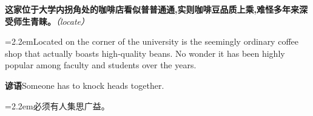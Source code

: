 \documentclass[11pt,a4paper]{article}
\newcommand{\num}[1]{\makebox[1.9em][r]{#1.}\hspace{0.3em}}
\newcommand{\prompt}[1]{\emph{\textcolor{tipblue}{\small（#1）}}}
\begin{document}
\num{4}\textbf{这家位于大学内拐角处的咖啡店看似普普通通,实则咖啡豆品质上乘,难怪多年来深受师生青睐。}\prompt{locate}

\vspace{0.15em}

\noindent\hangindent=2.2em\hspace{2.2em}Located on the corner of the university is the seemingly ordinary coffee shop that actually boasts high-quality beans. No wonder it has been highly popular among faculty and students over the years.

\vspace{0.4em}\noindent{\color{rulegray}\rule{\textwidth}{0.6pt}}\vspace{0.4em}

\num{5}\textbf{谚语}\quad Someone has to knock heads together.

\vspace{0.15em}

\noindent\hangindent=2.2em\hspace{2.2em}必须有人集思广益。
\end{document}
